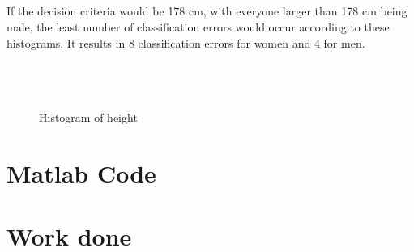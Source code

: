 \documentclass[10pt,a4paper]{article}
\begin{document}
\subsection{}
If the decision criteria would be 178 cm, with everyone larger than 178 cm being male, the least number of classification errors would occur according to these histograms. It results in 8 classification errors for women and 4 for men.

\section{}
\subsection{}
\begin{figure}[H]
  \centering
     \\
  \caption{Histogram of height}
  \label{fig:1_1}
\end{figure}

\section{Matlab Code}

\section{Work done}
\end{document}
